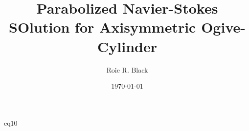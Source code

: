 \documentclass[11pt]{article}
\author{Roie R. Black}
\date{\today}
\title{Parabolized Navier-Stokes SOlution for Axisymmetric Ogive-Cylinder}
\begin{document}
\maketitle

{eq10}
\end{document}
